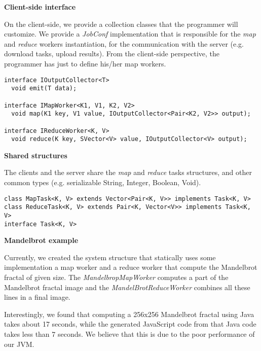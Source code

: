 \documentclass{article}
\begin{document}
\textbf{Client-side interface}

On the client-side, we provide a collection classes that the programmer will
customize. We provide a \textit{JobConf} implementation that is responsible for
the \textit{map} and \textit{reduce} workers instantiation, for the
communication with the server (e.g. download tasks, upload results). From the
client-side perspective, the programmer has just to define his/her map workers.

\begin{lstlisting}
interface IOutputCollector<T>
  void emit(T data);

interface IMapWorker<K1, V1, K2, V2>
  void map(K1 key, V1 value, IOutputCollector<Pair<K2, V2>> output);

interface IReduceWorker<K, V>
  void reduce(K key, SVector<V> value, IOutputCollector<V> output);
\end{lstlisting}


\textbf{Shared structures}

The clients and the server share the \textit{map} and \textit{reduce} tasks
structures, and other common types (e.g. serializable String, Integer, Boolean,
Void). 

\begin{lstlisting}
class MapTask<K, V> extends Vector<Pair<K, V>> implements Task<K, V>
class ReduceTask<K, V> extends Pair<K, Vector<V>> implements Task<K, V>
interface Task<K, V>
\end{lstlisting}

\textbf{Mandelbrot example}

Currently, we created the system structure that statically uses some
implementation a map worker and a reduce worker that compute the Mandelbrot 
fractal of given size. The \textit{MandelbropMapWorker} computes a part of
the Mandelbrot fractal image and the \textit{MandelBrotReduceWorker} combines 
all these lines in a final image. 

Interestingly, we found that computing a 256x256 Mandelbrot fractal using
Java takes about 17 seconds, while the generated JavaScript code from that Java
code takes less than 7 seconds. We believe that this is due to the poor
performance of our JVM.

\end{document}
